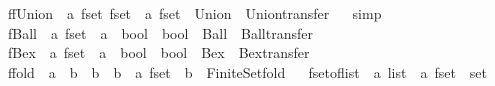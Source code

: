 \begin{isabellebody}
\endisatagproof
{\isafoldproof}%
%
\isadelimproof
\isanewline
%
\endisadelimproof
\isanewline
{}\isamarkupfalse%
\ ffUnion\ {\isacharcolon}{\isacharcolon}\ {\isachardoublequoteopen}{\isacharprime}a\ fset\ fset\ {\isasymRightarrow}\ {\isacharprime}a\ fset{\isachardoublequoteclose}\ \ Union\ \ Union{\isacharunderscore}transfer%
\isadelimproof
\ %
\endisadelimproof
%
\isatagproof
{}\isamarkupfalse%
\ simp%
\endisatagproof
{\isafoldproof}%
%
\isadelimproof
%
\endisadelimproof
\isanewline
\isanewline
{}\isamarkupfalse%
\ fBall\ {\isacharcolon}{\isacharcolon}\ {\isachardoublequoteopen}{\isacharprime}a\ fset\ {\isasymRightarrow}\ {\isacharparenleft}{\isacharprime}a\ {\isasymRightarrow}\ bool{\isacharparenright}\ {\isasymRightarrow}\ bool{\isachardoublequoteclose}\ \ Ball\ \ Ball{\isacharunderscore}transfer%
\isadelimproof
\ %
\endisadelimproof
%
\isatagproof
\isacommand{{\isachardot}}\isamarkupfalse%
%
\endisatagproof
{\isafoldproof}%
%
\isadelimproof
%
\endisadelimproof
\isanewline
{}\isamarkupfalse%
\ fBex\ {\isacharcolon}{\isacharcolon}\ {\isachardoublequoteopen}{\isacharprime}a\ fset\ {\isasymRightarrow}\ {\isacharparenleft}{\isacharprime}a\ {\isasymRightarrow}\ bool{\isacharparenright}\ {\isasymRightarrow}\ bool{\isachardoublequoteclose}\ \ Bex\ \ Bex{\isacharunderscore}transfer%
\isadelimproof
\ %
\endisadelimproof
%
\isatagproof
\isacommand{{\isachardot}}\isamarkupfalse%
%
\endisatagproof
{\isafoldproof}%
%
\isadelimproof
%
\endisadelimproof
\isanewline
\isanewline
{}\isamarkupfalse%
\ ffold\ {\isacharcolon}{\isacharcolon}\ {\isachardoublequoteopen}{\isacharparenleft}{\isacharprime}a\ {\isasymRightarrow}\ {\isacharprime}b\ {\isasymRightarrow}\ {\isacharprime}b{\isacharparenright}\ {\isasymRightarrow}\ {\isacharprime}b\ {\isasymRightarrow}\ {\isacharprime}a\ fset\ {\isasymRightarrow}\ {\isacharprime}b{\isachardoublequoteclose}\ \ Finite{\isacharunderscore}Set{\isachardot}fold%
\isadelimproof
\ %
\endisadelimproof
%
\isatagproof
\isacommand{{\isachardot}}\isamarkupfalse%
%
\endisatagproof
{\isafoldproof}%
%
\isadelimproof
%
\endisadelimproof
\isanewline
\isanewline
{}\isamarkupfalse%
\ fset{\isacharunderscore}of{\isacharunderscore}list\ {\isacharcolon}{\isacharcolon}\ {\isachardoublequoteopen}{\isacharprime}a\ list\ {\isasymRightarrow}\ {\isacharprime}a\ fset{\isachardoublequoteclose}\ \ set%

\end{isabellebody}

